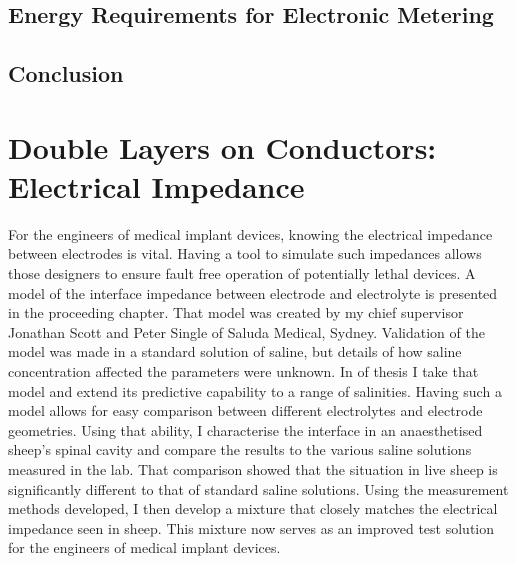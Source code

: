 
   \chapter{Energy Requirements for Electronic Metering}
     \label{chap:part1_energyHarvestingRequirements}
     


   \chapter{Conclusion}
     \label{chap:part1_conclusion}
     




\part{Double Layers on Conductors: Electrical Impedance}
  \label{part:doubleLayersOnConductors}

  For the engineers of medical implant devices, knowing the electrical impedance between electrodes is vital.
  Having a tool to simulate such impedances allows those designers to ensure fault free operation of potentially lethal devices.
  A model of the interface impedance between electrode and electrolyte is presented in the proceeding chapter.
  That model was created by my chief supervisor Jonathan Scott and Peter Single of Saluda Medical, Sydney.
  Validation of the model was made in a standard solution of saline, but details of how saline concentration affected the parameters were unknown.
  In \cref{part:doubleLayersOnConductors} of thesis I take that model and extend its predictive capability to a range of salinities.
  Having such a model allows for easy comparison between different electrolytes and electrode geometries.
  Using that ability, I characterise the interface in an anaesthetised sheep's spinal cavity and compare the results to the various saline solutions measured in the lab.
  That comparison showed that the situation in live sheep is significantly different to that of standard saline solutions.
  Using the measurement methods developed, I then develop a mixture that closely matches the electrical impedance seen in sheep.
  This mixture now serves as an improved test solution for the engineers of medical implant devices.

